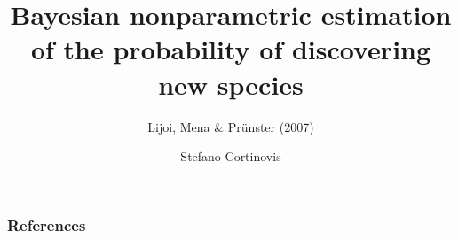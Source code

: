\documentclass[11pt, handout]{beamer}
\title[Lijoi et al. (2007)]{Bayesian nonparametric estimation of the probability of discovering new species}
\subtitle{Lijoi, Mena \& Pr{\"u}nster (2007)}
\author{Stefano Cortinovis}
\date[20605 - Machine Learning II]{\displaydate{date}}
\begin{document}
\nocite{*}

\begin{frame}
\titlepage
\end{frame}

\begin{frame}[allowframebreaks] %
\frametitle{References}
\scriptsize{}

\end{frame}
 
\end{document}
